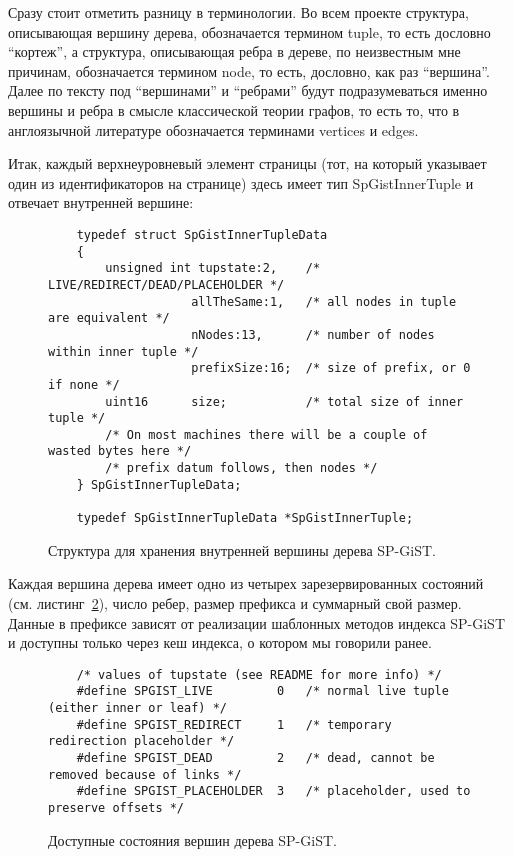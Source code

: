 \documentclass[12pt,oneside]{amsart}
\begin{document}
Сразу стоит отметить разницу в терминологии. Во всем проекте структура, описывающая вершину дерева, обозначается термином tuple, то есть дословно ``кортеж'', а структура, описывающая ребра в дереве, по неизвестным мне причинам, обозначается термином node, то есть, дословно, как раз ``вершина''. Далее по тексту под ``вершинами'' и ``ребрами'' будут подразумеваться именно вершины и ребра в смысле классической теории графов, то есть то, что в англоязычной литературе обозначается терминами vertices и edges.

Итак, каждый верхнеуровневый элемент страницы (тот, на который указывает один из идентификаторов на странице) здесь имеет тип SpGistInnerTuple и отвечает внутренней вершине:

\begin{figure}[ht]
\begin{lstlisting}
	typedef struct SpGistInnerTupleData
	{
		unsigned int tupstate:2,	/* LIVE/REDIRECT/DEAD/PLACEHOLDER */
					allTheSame:1,	/* all nodes in tuple are equivalent */
					nNodes:13,		/* number of nodes within inner tuple */
					prefixSize:16;	/* size of prefix, or 0 if none */
		uint16		size;			/* total size of inner tuple */
		/* On most machines there will be a couple of wasted bytes here */
		/* prefix datum follows, then nodes */
	} SpGistInnerTupleData;

	typedef SpGistInnerTupleData *SpGistInnerTuple;
\end{lstlisting}
\caption{Структура для хранения внутренней вершины дерева SP-GiST.}\label{spInnerTuple}
\end{figure}

Каждая вершина дерева имеет одно из четырех зарезервированных состояний (см. листинг~\ref{spTupleState}), число ребер, размер префикса и суммарный свой размер. Данные в префиксе зависят от реализации шаблонных методов индекса SP-GiST и доступны только через кеш индекса, о котором мы говорили ранее.

\begin{figure}[ht]
\begin{lstlisting}
	/* values of tupstate (see README for more info) */
	#define SPGIST_LIVE			0	/* normal live tuple (either inner or leaf) */
	#define SPGIST_REDIRECT		1	/* temporary redirection placeholder */
	#define SPGIST_DEAD			2	/* dead, cannot be removed because of links */
	#define SPGIST_PLACEHOLDER	3	/* placeholder, used to preserve offsets */
\end{lstlisting}
\caption{Доступные состояния вершин дерева SP-GiST.}\label{spTupleState}
\end{figure}
\end{document}
